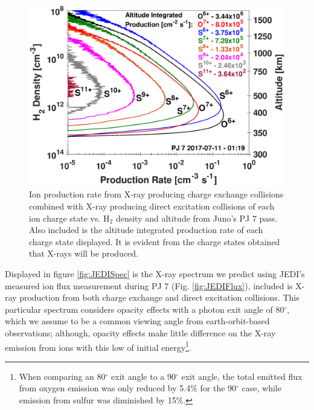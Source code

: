 \documentclass[draft]{agujournal2018}
\begin{document}
\begin{figure}
    \centering
    \includegraphics[width=\textwidth]{Figures/PJ7IonProd.eps}
    \caption{Ion production rate from X-ray producing charge exchange collisions combined with X-ray producing direct excitation collisions of each ion charge state vs. H$_2$ density and altitude from Juno's PJ 7 pass. Also included is the altitude integrated production rate of each charge state displayed. It is evident from the charge states obtained that X-rays will be produced.}
    \label{fig:JEDIIonProd}
\end{figure}

Displayed in figure \ref{fig:JEDISpec} is the X-ray spectrum we predict using JEDI's measured ion flux measurement during PJ 7 (Fig. \ref{fig:JEDIFlux}), included is X-ray production from both charge exchange and direct excitation collisions.
This particular spectrum considers opacity effects with a photon exit angle of 80$^{\circ}$, which we assume to be a common viewing angle from earth-orbit-based observations; although, opacity effects make little difference on the X-ray emission from ions with this low of initial energy\footnote{When comparing an 80$^{\circ}$ exit angle to a 90$^{\circ}$ exit angle, the total emitted flux from oxygen emission was only reduced by 5.4$\%$ for the 90$^{\circ}$ case, while emission from sulfur was diminished by 15$\%$.}.
\end{document}
